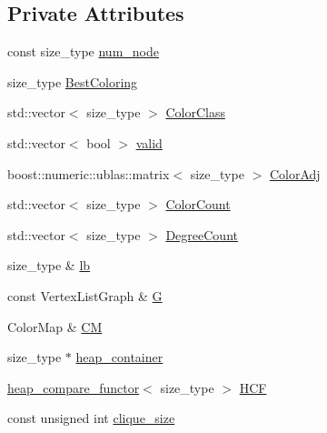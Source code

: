 \subsection*{Private Attributes}
\begin{DoxyCompactItemize}
\item 
const size\+\_\+type \hyperlink{classboost_1_1maxclique__dsatur__coloring__helper_a633bc42872ba1e8c51ae97b4ca092e92}{num\+\_\+node}
\item 
size\+\_\+type \hyperlink{classboost_1_1maxclique__dsatur__coloring__helper_ae8121f8ea3161423af724312f444ffc4}{Best\+Coloring}
\item 
std\+::vector$<$ size\+\_\+type $>$ \hyperlink{classboost_1_1maxclique__dsatur__coloring__helper_a60b34646f3805dd544857d2ce82a1397}{Color\+Class}
\item 
std\+::vector$<$ bool $>$ \hyperlink{classboost_1_1maxclique__dsatur__coloring__helper_a3efdfe934f0dd18f941dac27c5481b05}{valid}
\item 
boost\+::numeric\+::ublas\+::matrix$<$ size\+\_\+type $>$ \hyperlink{classboost_1_1maxclique__dsatur__coloring__helper_a448f9ff26409faef73fa41e6c59c9cfe}{Color\+Adj}
\item 
std\+::vector$<$ size\+\_\+type $>$ \hyperlink{classboost_1_1maxclique__dsatur__coloring__helper_ac74b872f20e7feeaecb8ba1c69be579e}{Color\+Count}
\item 
std\+::vector$<$ size\+\_\+type $>$ \hyperlink{classboost_1_1maxclique__dsatur__coloring__helper_a00bf4408982a3547d654e661079c9f4b}{Degree\+Count}
\item 
size\+\_\+type \& \hyperlink{classboost_1_1maxclique__dsatur__coloring__helper_a768edb034872c46d8f1b26ed21f82f22}{lb}
\item 
const Vertex\+List\+Graph \& \hyperlink{classboost_1_1maxclique__dsatur__coloring__helper_af420ca87f673bcf01207bb880bd129e7}{G}
\item 
Color\+Map \& \hyperlink{classboost_1_1maxclique__dsatur__coloring__helper_aace06ca9eef492772bb27436dc67af3b}{CM}
\item 
size\+\_\+type $\ast$ \hyperlink{classboost_1_1maxclique__dsatur__coloring__helper_a8af7ffed5555add33c712f2da0b9320d}{heap\+\_\+container}
\item 
\hyperlink{structboost_1_1heap__compare__functor}{heap\+\_\+compare\+\_\+functor}$<$ size\+\_\+type $>$ \hyperlink{classboost_1_1maxclique__dsatur__coloring__helper_ac3684724839cfab3a4cf31ee2f4a84e8}{H\+CF}
\item 
const unsigned int \hyperlink{classboost_1_1maxclique__dsatur__coloring__helper_a1a0be72747da9f7562b13d9c544e480b}{clique\+\_\+size}

\end{DoxyCompactItemize}
